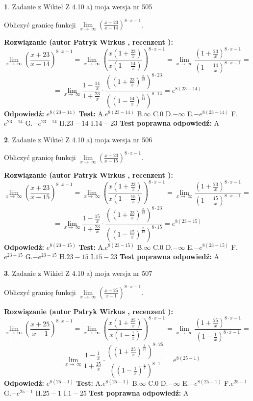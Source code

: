 \documentclass[12pt, a4paper]{article}
\theoremstyle{definition} %
\newtheorem{zad}{}
\newcommand{\zadStart}[1]{\begin{zad}#1\newline}
\newcommand{\zadStop}{\end{zad}}
\newcommand{\rozwStart}[2]{\noindent \textbf{Rozwiązanie (autor #1 , recenzent #2): }\newline}
\newcommand{\rozwStop}{\newline}
\newcommand{\odpStart}{\noindent \textbf{Odpowiedź:}\newline}
\newcommand{\odpStop}{\newline}
\newcommand{\testStart}{\noindent \textbf{Test:}\newline}
\newcommand{\testStop}{\newline}
\newcommand{\kluczStart}{\noindent \textbf{Test poprawna odpowiedź:}\newline}
\newcommand{\kluczStop}{\newline}
\begin{document}
\zadStart{Zadanie z Wikieł Z 4.10 a) moja wersja nr 505}


Obliczyć granicę funkcji  $\lim\limits_{x\to\ \infty}(\frac{x+23}{x-14})^{8\cdot x-1}$.
\zadStop
\rozwStart{Patryk Wirkus}{}
$$\lim\limits_{x\to\ \infty}(\frac{x+23}{x-14})^{8\cdot x-1} = \lim\limits_{x\to\ \infty}(\frac{x(1+\frac{23}{x})}{x(1-\frac{14}{x})})^{8\cdot x-1}=\lim\limits_{x\to\ \infty}\frac{(1+\frac{23}{x})^{8\cdot x-1}}{(1-\frac{14}{x})^{8\cdot x-1}}=$$
$$=\lim\limits_{x\to\ \infty}\frac{1-\frac{14}{x}}{1+\frac{23}{x}}\cdot\frac{((1+\frac{23}{x})^{\frac{x}{23}})^{8\cdot23}}{((1-\frac{14}{x})^{\frac{x}{14}})^{8\cdot14}}=e^{8(23-14)}$$
\rozwStop
\odpStart
$e^{8(23-14)}$
\odpStop
\testStart
A.$e^{8(23-14)}$ B.$\infty$ C.$0$ D.$-\infty$ E.$-e^{8(23-14)}$
F.$e^{23-14}$ G.$-e^{23-14}$
H.$23-14$
I.$14-23$
\testStop
\kluczStart
A
\kluczStop



\zadStart{Zadanie z Wikieł Z 4.10 a) moja wersja nr 506}


Obliczyć granicę funkcji  $\lim\limits_{x\to\ \infty}(\frac{x+23}{x-15})^{8\cdot x-1}$.
\zadStop
\rozwStart{Patryk Wirkus}{}
$$\lim\limits_{x\to\ \infty}(\frac{x+23}{x-15})^{8\cdot x-1} = \lim\limits_{x\to\ \infty}(\frac{x(1+\frac{23}{x})}{x(1-\frac{15}{x})})^{8\cdot x-1}=\lim\limits_{x\to\ \infty}\frac{(1+\frac{23}{x})^{8\cdot x-1}}{(1-\frac{15}{x})^{8\cdot x-1}}=$$
$$=\lim\limits_{x\to\ \infty}\frac{1-\frac{15}{x}}{1+\frac{23}{x}}\cdot\frac{((1+\frac{23}{x})^{\frac{x}{23}})^{8\cdot23}}{((1-\frac{15}{x})^{\frac{x}{15}})^{8\cdot15}}=e^{8(23-15)}$$
\rozwStop
\odpStart
$e^{8(23-15)}$
\odpStop
\testStart
A.$e^{8(23-15)}$ B.$\infty$ C.$0$ D.$-\infty$ E.$-e^{8(23-15)}$
F.$e^{23-15}$ G.$-e^{23-15}$
H.$23-15$
I.$15-23$
\testStop
\kluczStart
A
\kluczStop



\zadStart{Zadanie z Wikieł Z 4.10 a) moja wersja nr 507}


Obliczyć granicę funkcji  $\lim\limits_{x\to\ \infty}(\frac{x+25}{x-1})^{8\cdot x-1}$.
\zadStop
\rozwStart{Patryk Wirkus}{}
$$\lim\limits_{x\to\ \infty}(\frac{x+25}{x-1})^{8\cdot x-1} = \lim\limits_{x\to\ \infty}(\frac{x(1+\frac{25}{x})}{x(1-\frac{1}{x})})^{8\cdot x-1}=\lim\limits_{x\to\ \infty}\frac{(1+\frac{25}{x})^{8\cdot x-1}}{(1-\frac{1}{x})^{8\cdot x-1}}=$$
$$=\lim\limits_{x\to\ \infty}\frac{1-\frac{1}{x}}{1+\frac{25}{x}}\cdot\frac{((1+\frac{25}{x})^{\frac{x}{25}})^{8\cdot25}}{((1-\frac{1}{x})^{\frac{x}{1}})^{8\cdot1}}=e^{8(25-1)}$$
\rozwStop
\odpStart
$e^{8(25-1)}$
\odpStop
\testStart
A.$e^{8(25-1)}$ B.$\infty$ C.$0$ D.$-\infty$ E.$-e^{8(25-1)}$
F.$e^{25-1}$ G.$-e^{25-1}$
H.$25-1$
I.$1-25$
\testStop
\kluczStart
A
\kluczStop
\end{document}
